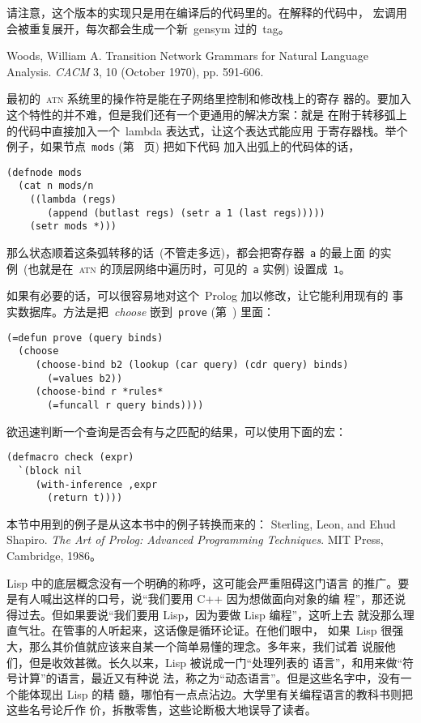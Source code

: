 \begin{notes}
  请注意，这个版本的实现只是用在编译后的代码里的。在解释的代码中，
  宏调用会被重复展开，每次都会生成一个新~gensym 过的~tag。

  Woods, William A. Transition Network Grammars for Natural Language
  Analysis.  \emph{CACM} 3, 10 (October 1970), pp. 591-606.

  最初的~\textsc{atn} 系统里的操作符是能在子网络里控制和修改栈上的寄存
  器的。要加入这个特性的并不难，但是我们还有一个更通用的解决方案：就是
  在附于转移弧上的代码中直接加入一个~lambda 表达式，让这个表达式能应用
  于寄存器栈。举个例子，如果节点~\texttt{mods}
  (第~\pageref{fig:sub-network_for_strings_of_modifiers} 页) 把如下代码
  加入出弧上的代码体的话，
\begin{verbatim}
(defnode mods
  (cat n mods/n
    ((lambda (regs)
       (append (butlast regs) (setr a 1 (last regs)))))
    (setr mods *)))
\end{verbatim}
  那么状态顺着这条弧转移的话~(不管走多远)，都会把寄存器~\texttt{a} 的最上面
  的实例~(也就是在~\textsc{atn} 的顶层网络中遍历时，可见的~\texttt{a}
  实例) 设置成~\texttt{1}。

  
  如果有必要的话，可以很容易地对这个~Prolog 加以修改，让它能利用现有的
  事实数据库。方法是把~\emph{choose} 嵌到~\texttt{prove}
  (第~\pageref{fig:compilation_of_queries}) 里面：
\begin{verbatim}
(=defun prove (query binds)
  (choose
     (choose-bind b2 (lookup (car query) (cdr query) binds)
       (=values b2))
     (choose-bind r *rules*
       (=funcall r query binds))))
\end{verbatim}

  欲迅速判断一个查询是否会有与之匹配的结果，可以使用下面的宏：

\begin{verbatim}
(defmacro check (expr)
  `(block nil
     (with-inference ,expr
       (return t))))
\end{verbatim}

  本节中用到的例子是从这本书中的例子转换而来的：
  Sterling, Leon, and Ehud Shapiro. \emph{The Art of Prolog: Advanced
  Programming Techniques}. MIT Press, Cambridge, 1986。

  Lisp 中的底层概念没有一个明确的称呼，这可能会严重阻碍这门语言
  的推广。要是有人喊出这样的口号，说“我们要用 C++ 因为想做面向对象的编
  程”，那还说得过去。但如果要说“我们要用 Lisp，因为要做 Lisp 编程”，这听上去
  就没那么理直气壮。在管事的人听起来，这话像是循环论证。在他们眼中，
  如果~Lisp 很强大，那么其价值就应该来自某一个简单易懂的理念。多年来，我们试着
  说服他们，但是收效甚微。长久以来，Lisp 被说成一门“处理列表的
  语言”，和用来做“符号计算”的语言，最近又有种说
  法，称之为“动态语言”。但是这些名字中，没有一个能体现出 Lisp 的精
  髓，哪怕有一点点沾边。大学里有关编程语言的教科书则把这些名号论斤作
  价，拆散零售，这些论断极大地误导了读者。


\end{notes}
